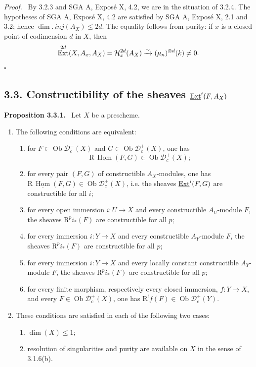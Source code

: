 \documentclass[11pt]{article}
\theoremstyle{plain}
\theoremstyle{definition}
\theoremstyle{remark}
\newenvironment{statement}[1]{\par\medskip\noindent\textbf{#1.}\ }{\par\medskip}
\newenvironment{prooftext}{\par\noindent\textit{Proof.}\ }{\par\medskip}
\newcommand{\D}{\mathcal D}\newcommand{\E}{\mathcal E}\newcommand{\F}{\mathcal F}
\DeclareMathOperator{\Hom}{Hom}
\DeclareMathOperator{\Ext}{Ext}
\DeclareMathOperator{\ob}{Ob}
\newcommand{\R}{\mathrm R}
\newcommand{\qedtext}{\hfill$\square$}
\begin{document}
\begin{prooftext}
By 3.2.3 and SGA A, Exposé X, 4.2, we are in the situation of 3.2.4. The hypotheses of SGA A, Exposé X, 4.2 are satisfied by SGA A, Exposé X, 2.1 and 3.2; hence $\dim.\,inj(A_X)\le2d$. The equality follows from purity: if $x$ is a closed point of codimension $d$ in $X$, then
\[
   \Ext^{2d}(X,A_x,A_X)=\Hh^{2d}_x(A_X)
      \xrightarrow{\sim}(\mu_n)^{\otimes d}(k)\ne0.
\]
\qedtext
\end{prooftext}

\subsection*{3.3. Constructibility of the sheaves $\underline{\operatorname{Ext}}^i(F,A_X)$}

\begin{statement}{Proposition 3.3.1}
Let $X$ be a prescheme.
\begin{enumerate}[label=\alph*)]
\item The following conditions are equivalent:
\begin{enumerate}[label=(\roman*)]
\item for $F\in\ob\D_c^-(X)$ and $G\in\ob\D_c^+(X)$, one has
\[
   \R\,\underline{\Hom}(F,G)\in\ob\D_c^+(X);
\]
\item[(i bis)] for every pair $(F,G)$ of constructible $A_X$-modules, one has $\R\,\underline{\Hom}(F,G)\in\ob\D_c^+(X)$, i.e. the sheaves $\underline{\operatorname{Ext}}^i(F,G)$ are constructible for all $i$;
\item for every open immersion $i:U\to X$ and every constructible $A_U$-module $F$, the sheaves $\R^pi_*(F)$ are constructible for all $p$;
\item[(ii bis)] for every immersion $i:Y\to X$ and every constructible $A_Y$-module $F$, the sheaves $\R^pi_*(F)$ are constructible for all $p$;
\item[(ii ter)] for every immersion $i:Y\to X$ and every locally constant constructible $A_Y$-module $F$, the sheaves $\R^pi_*(F)$ are constructible for all $p$;
\item for every finite morphism, respectively every closed immersion, $f:Y\to X$, and every $F\in\ob\D_c^+(X)$, one has $\R^!f(F)\in\ob\D_c^+(Y)$.
\end{enumerate}
\item These conditions are satisfied in each of the following two cases:
\begin{enumerate}[label=(\roman*)]
\item $\dim(X)\le1$;
\item resolution of singularities and purity are available on $X$ in the sense of 3.1.6(b).
\end{enumerate}
\end{enumerate}
\end{statement}
\end{document}
